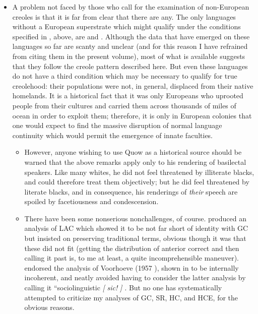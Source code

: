 \begin{itemize}
\begin{itemize}
\begin{itemize}
\begin{itemize}
\begin{itemize}
\begin{itemize}
\item A problem not faced by those who call for the examination of non-European creoles is that it is far from clear that there are any. The only languages without a European superstrate which might qualify under the conditions specified in , above, are  and . Although the data that have emerged on these lan\-guages so far are scanty and unclear (and for this reason I have refrained from citing them in the present volume), most of what is available suggests that they follow the creole pattern described here. But even these languages do not have a third condition which may be necessary to qualify for true creolehood: their populations were not, in general, displaced from their native homelands. It is a historical fact that it was only Europeans who uprooted people from their cultures and carried them across thousands of miles of ocean in order to exploit them;
therefore, it is only in European colonies that one would expect to find the massive disruption of normal language continuity which would permit the emergence of innate faculties.

\begin{itemize}
\item However, anyone wishing to use Quow as a historical source should be warned that the above remarks apply only to his rendering of basilectal speakers. Like many whites, he did not feel threatened by illiterate blacks, and could therefore treat them objectively; but he did feel threatened by literate blacks, and in consequence, his ren\-derings of \textit{their} speech are spoiled by facetiousness and condescension.
\item There have been some nonserious nonchallenges, of course. \citet{Christie1976} produced an analysis of LAC which showed it to be not far short of identity with GC but insisted on preserving traditional terms, obvious though it was that these did not fit (getting the distri\-bution of anterior correct and then calling it past is, to me at least, a quite incomprehensible maneuver). \citet{Seuren1980} endorsed the analysis of Voorhoeve (1957 ), shown in \citet{Bickerton1975} to be intern\-ally incoherent, and neatly avoided having to consider the latter analy\-sis by calling it ``sociolinguistic \textit{[} \textit{sic!} \textit{]} \textit{.} But no one has systematically attempted to criticize my analyses of GC, SR, HC, and HCE, for the obvious reasons.


\end{itemize}
\end{itemize}
\end{itemize}
\end{itemize}
\end{itemize}
\end{itemize}
\end{itemize}
